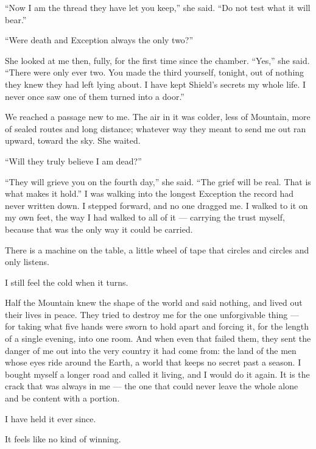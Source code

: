 ``Now I am the thread they have let you keep,'' she said. ``Do not test what it will bear.''\par

``Were death and Exception always the only two?''\par

She looked at me then, fully, for the first time since the chamber. ``Yes,'' she said. ``There were only ever two. You made the third yourself, tonight, out of nothing they knew they had left lying about. I have kept Shield's secrets my whole life. I never once saw one of them turned into a door.''\par

We reached a passage new to me. The air in it was colder, less of Mountain, more of sealed routes and long distance; whatever way they meant to send me out ran upward, toward the sky. She waited.\par

``Will they truly believe I am dead?''\par

``They will grieve you on the fourth day,'' she said. ``The grief will be real. That is what makes it hold.'' I was walking into the longest Exception the record had never written down. I stepped forward, and no one dragged me. I walked to it on my own feet, the way I had walked to all of it --- carrying the trust myself, because that was the only way it could be carried.\par

\ornament

There is a machine on the table, a little wheel of tape that circles and circles and only listens.\par

I still feel the cold when it turns.\par

Half the Mountain knew the shape of the world and said nothing, and lived out their lives in peace. They tried to destroy me for the one unforgivable thing --- for taking what five hands were sworn to hold apart and forcing it, for the length of a single evening, into one room. And when even that failed them, they sent the danger of me out into the very country it had come from: the land of the men whose eyes ride around the Earth, a world that keeps no secret past a season. I bought myself a longer road and called it living, and I would do it again. It is the crack that was always in me --- the one that could never leave the whole alone and be content with a portion.\par

I have held it ever since.\par

It feels like no kind of winning.\par

\ornament
